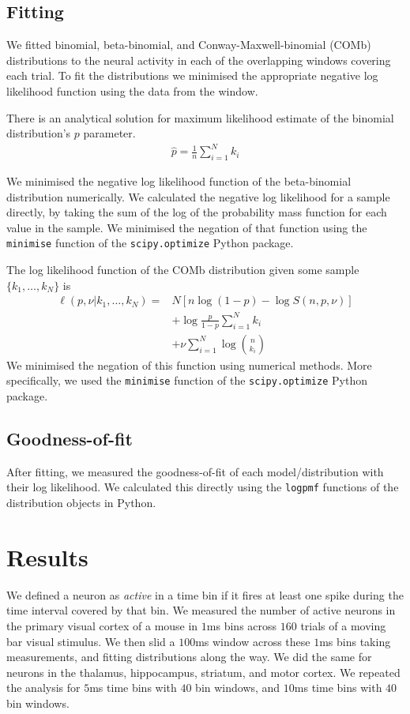     \subsection{Fitting}
    We fitted binomial, beta-binomial, and Conway-Maxwell-binomial (COMb) distributions to the neural activity in each of the overlapping windows covering each trial. To fit the distributions we minimised the appropriate negative log likelihood function using the data from the window.

    There is an analytical solution for maximum likelihood estimate of the binomial distribution's $p$ parameter.
    \begin{align}\label{eq:binomial_log_like_p_estimate}
      \hat{p} = \frac{1}{n}\sum_{i=1}^N k_i
    \end{align}

    We minimised the negative log likelihood function of the beta-binomial distribution numerically. We calculated the negative log likelihood for a sample directly, by taking the sum of the log of the probability mass function for each value in the sample. We minimised the negation of that function using the \texttt{minimise} function of the \texttt{scipy.optimize} Python package.

    The log likelihood function of the COMb distribution given some sample \\ $\lbrace k_1, \dots, k_N \rbrace$ is
    \begin{align}\label{eq:comb_log_like}
      \ell (p,\nu | k_1,\dots,k_N) =& N\left[n\log(1-p) - \log S(n,p,\nu)\right]  \\
        &+ \log \frac{p}{1-p} \sum_{i=1}^N k_i \\
        &+ \nu \sum_{i=1}^N \log \binom{n}{k_i}
    \end{align}
    We minimised the negation of this function using numerical methods. More specifically, we used the \texttt{minimise} function of the \texttt{scipy.optimize} Python package.

    \subsection{Goodness-of-fit}
    After fitting, we measured the goodness-of-fit of each model/distribution with their log likelihood. We calculated this directly using the \texttt{logpmf} functions of the distribution objects in Python.

\section{Results}
We defined a neuron as \textit{active} in a time bin if it fires at least one spike during the time interval covered by that bin. We measured the number of active neurons in the primary visual cortex of a mouse in $1$ms bins across $160$ trials of a moving bar visual stimulus. We then slid a $100$ms window across these $1$ms bins taking measurements, and fitting distributions along the way. We did the same for neurons in the thalamus, hippocampus, striatum, and motor cortex. We repeated the analysis for $5$ms time bins with $40$ bin windows, and $10$ms time bins with $40$ bin windows.

